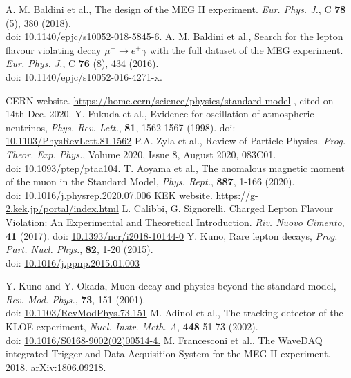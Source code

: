 \documentclass[report]{jsbook}
\begin{document}
\begin{thebibliography}{99}
 A. M. Baldini et al., The design of the MEG II experiment. {\it Eur. Phys. J.}, C {\bf 78} (5), 380 (2018). \\ 
doi: \href{https://doi.org/10.1140/epjc/s10052-018-5845-6}{10.1140/epjc/s10052-018-5845-6.}
 A. M. Baldini et al., Search for the lepton flavour violating decay $\mu^+ \to e^+ \gamma$ with the full dataset of the MEG experiment. {\it Eur. Phys. J.}, C {\bf 76} (8), 434 (2016). \\ 
doi: \href{https://doi.org/10.1140/epjc/s10052-016-4271-x}{10.1140/epjc/s10052-016-4271-x.}

 CERN website. \url{https://home.cern/science/physics/standard-model} , cited on 14th Dec. 2020.
 Y. Fukuda et al., Evidence for oscillation of atmospheric neutrinos, {\it Phys. Rev. Lett.}, {\bf 81}, 1562-1567 (1998). 
doi: \href{https://doi.org/10.1103/PhysRevLett.81.1562}{10.1103/PhysRevLett.81.1562}
 P.A. Zyla et al., Review of Particle Physics.  {\it Prog. Theor. Exp. Phys.}, Volume 2020, Issue 8, August 2020, 083C01. \\
doi: \href{https://doi.org/10.1093/ptep/ptaa104}{10.1093/ptep/ptaa104.}
 T. Aoyama et al., The anomalous magnetic moment of the muon in the Standard Model, {\it Phys. Rept.}, {\bf 887}, 1-166 (2020). \\
doi: \href{https://doi.org/10.1016/j.physrep.2020.07.006}{10.1016/j.physrep.2020.07.006}
 KEK website. \url{https://g-2.kek.jp/portal/index.html}
 L. Calibbi, G. Signorelli, Charged Lepton Flavour Violation: An Experimental and Theoretical Introduction. {\it Riv. Nuovo Cimento}, {\bf 41} (2017).
doi: \href{https://doi.org/10.1393/ncr/i2018-10144-0}{10.1393/ncr/i2018-10144-0}
 Y. Kuno, Rare lepton decays, {\it Prog. Part. Nucl. Phys.}, {\bf 82}, 1-20 (2015). \\
doi: \href{https://doi.org/10.1016/j.ppnp.2015.01.003}{10.1016/j.ppnp.2015.01.003}

 Y. Kuno and Y. Okada, Muon decay and physics beyond the standard model, {\it Rev. Mod. Phys.}, {\bf 73}, 151 (2001). \\
doi: \href{http://dx.doi.org/10.1103/RevModPhys.73.151}{10.1103/RevModPhys.73.151}
 M. Adinol et al., The tracking detector of the KLOE experiment, {\it Nucl. Instr. Meth. A}, {\bf 448} 51-73 (2002). \\
doi: \href{http://dx.doi.org/10.1016/S0168-9002(02)00514-4}{10.1016/S0168-9002(02)00514-4.}
 M. Francesconi et al., The WaveDAQ integrated Trigger and Data Acquisition System for the MEG II experiment. 2018. \href{http://arxiv.org/abs/1806.09218}{arXiv:1806.09218.} 



\end{thebibliography}
\end{document}

